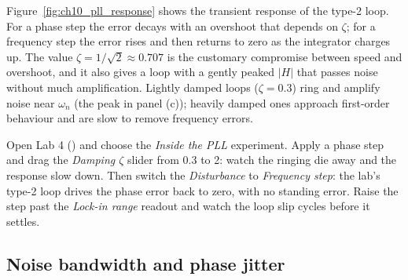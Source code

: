 Figure~\ref{fig:ch10_pll_response} shows the transient response of the type-2 loop. For a phase step
the error decays with an overshoot that depends on $\zeta$; for a frequency step the error rises and
then returns to zero as the integrator charges up. The value $\zeta=1/\sqrt2\approx0.707$ is the
customary compromise between speed and overshoot, and it also gives a loop with a gently peaked
$|H|$ that passes noise without much amplification. Lightly damped loops ($\zeta=0.3$) ring and
amplify noise near $\omega_n$ (the peak in panel (c)); heavily damped ones approach first-order
behaviour and are slow to remove frequency errors.


\begin{tryit}
Open Lab 4 () and choose the \emph{Inside the PLL} experiment.
Apply a phase step and drag the \emph{Damping $\zeta$} slider from 0.3 to 2: watch the ringing die
away and the response slow down. Then switch the \emph{Disturbance} to \emph{Frequency step}: the
lab's type-2 loop drives the phase error back to zero, with no standing error. Raise the step past
the \emph{Lock-in range} readout and watch the loop slip cycles before it settles.
\end{tryit}

\subsection{Noise bandwidth and phase jitter}

